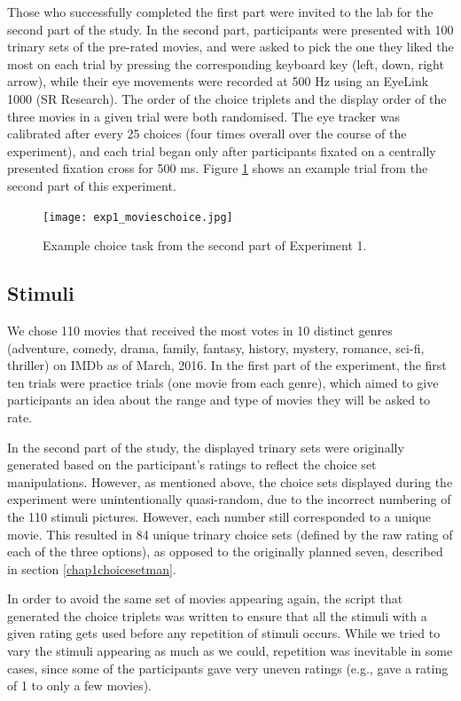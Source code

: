 \documentclass[11pt,a4paper]{article}
\begin{document}
Those who successfully completed the first part were invited to the lab for the second part of the study. In the second part, participants were presented with 100 trinary sets of the pre-rated movies, and were asked to pick the one they liked the most on each trial by pressing the corresponding keyboard key (left, down, right arrow), while their eye movements were recorded at 500 Hz using an EyeLink 1000 (SR Research). The order of the choice triplets and the display order of the three movies in a given trial were both randomised. The eye tracker was calibrated after every 25 choices (four times overall over the course of the experiment), and each trial began only after participants fixated on a centrally presented fixation cross for 500 ms. Figure \ref{fig:exp1_movieschoice} shows an example trial from the second part of this experiment.

\begin{figure}[htb!]
\captionsetup{justification=centering}
\centering
\caption{Example choice task from the second part of Experiment 1. }
\texttt{[image: exp1\_movieschoice.jpg]}
\label{fig:exp1_movieschoice}
\end{figure}



\subsection{Stimuli}

We chose 110 movies that received the most votes in 10 distinct genres (adventure, comedy, drama, family, fantasy, history, mystery, romance, sci-fi, thriller) on IMDb as of March, 2016. In the first part of the experiment, the first ten trials were practice trials (one movie from each genre), which aimed to give participants an idea about the range and type of movies they will be asked to rate. 

In the second part of the study, the displayed trinary sets were originally generated based on the participant's ratings to reflect the choice set manipulations. However, as mentioned above, the choice sets displayed during the experiment were unintentionally quasi-random, due to the incorrect numbering of the 110 stimuli pictures. However, each number still corresponded to a unique movie. This resulted in 84 unique trinary choice sets (defined by the raw rating of each of the three options), as opposed to the originally planned seven, described in section \ref{chap1choicesetman}. 

In order to avoid the same set of movies appearing again, the script that generated the choice triplets was written to ensure that all the stimuli with a given rating gets used before any repetition of stimuli occurs. While we tried to vary the stimuli appearing as much as we could, repetition was inevitable in some cases, since some of the participants gave very uneven ratings (e.g., gave a rating of 1 to only a few movies). 
\end{document}
